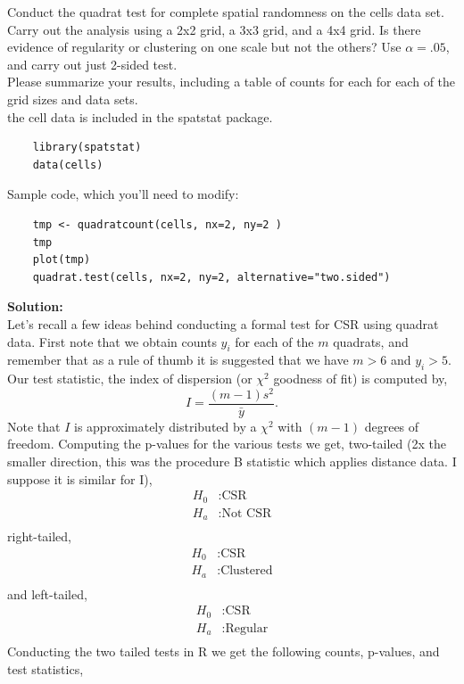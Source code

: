\documentclass[12pt]{article}
\makeatletter
\theoremstyle{homework}
\newenvironment{exercise}[1]
{\def\@currentlabel{#1}\exercisecore}
{\endexercisecore}
\newcommand{\localhead}[1]{\par\smallskip\noindent\textbf{#1}\nobreak\\}%
\newcommand\solution{\localhead{Solution:}}
\makeatother
\begin{document}
\begin{exercise}{1} Conduct the quadrat test for complete spatial randomness on the cells data set. Carry out the analysis using 
  a 2x2 grid, a 3x3 grid, and a 4x4 grid. Is there evidence of regularity or clustering on one scale but not the others? Use $\alpha = .05$, 
  and carry out just 2-sided test.\\
  Please summarize your results, including a table of counts for each for each of the grid sizes and data sets.\\
  the cell data is included in the spatstat package. 

  \begin{footnotesize}
  \begin{verbatim}
    library(spatstat)
    data(cells)
  \end{verbatim}
  \end{footnotesize}  

  Sample code, which you'll need to modify:

  \begin{footnotesize}
  \begin{verbatim}
    tmp <- quadratcount(cells, nx=2, ny=2 )
    tmp
    plot(tmp)
    quadrat.test(cells, nx=2, ny=2, alternative="two.sided")
  \end{verbatim}
  \end{footnotesize}  
  \solution Let's recall a few ideas behind conducting a formal test for CSR using quadrat data. First note that we obtain counts $y_i$
  for each of the $m$ quadrats, and remember that as a rule of thumb it is suggested that we have $m > 6$ and $y_i > 5$. Our test statistic, the index of dispersion (or $\chi^2$ goodness of fit)
  is computed by,  
  \begin{equation*}
    I = \dfrac{(m-1)s^2}{\bar{y}}. 
  \end{equation*}
  Note that $I$ is approximately distributed by a $\chi^2$ with $(m-1)$ degrees of freedom. Computing the p-values for the various tests we get,
  two-tailed (2x the smaller direction, this was the procedure B statistic which applies distance data. I suppose it is similar for I), 
  \begin{align*}
    H_0&: \text{CSR}\\
    H_a&: \text{Not CSR}\\
  \end{align*}
  right-tailed, 
  \begin{align*}
    H_0&: \text{CSR}\\
    H_a&: \text{Clustered}\\
  \end{align*}
  and left-tailed, 
  \begin{align*}
    H_0&: \text{CSR}\\
    H_a&: \text{Regular}\\
  \end{align*}
  Conducting the two tailed tests in R we get the following counts, p-values, and test statistics, 


\end{exercise}
\end{document}
